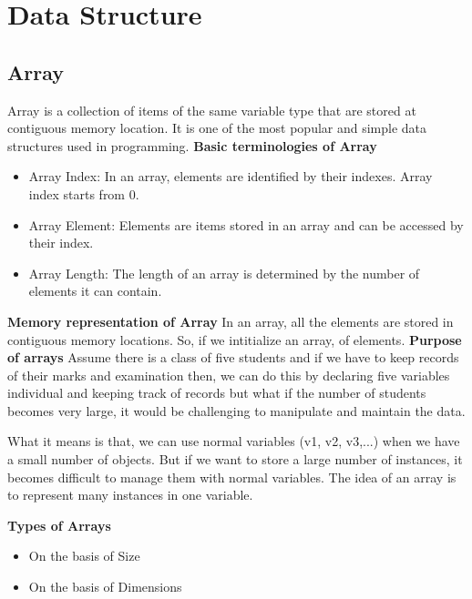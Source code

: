 \section{Data Structure}

\subsection{Array}
Array is a collection of items of the same variable type that are stored
at contiguous memory location. It is one of the most popular and simple
data structures used in programming.
\textbf{Basic terminologies of Array}
\begin{itemize}
\item Array Index: In an array, elements are identified by their
indexes. Array index starts from 0.
\item Array Element: Elements are items stored in an array and can be
accessed by their index.
\item Array Length: The length of an array is determined by the number
of elements it can contain.
\end{itemize}
\textbf{Memory representation of Array}
In an array, all the elements are stored in contiguous memory locations.
So, if we intitialize an array, of elements.
\textbf{Purpose of arrays}
Assume there is a class of five students and if we have to keep records
of their marks and examination then, we can do this by declaring five
variables individual and keeping track of records but what if the number
of students becomes very large, it would be challenging to manipulate
and maintain the data.

What it means is that, we can use normal variables (v1, v2, v3,...)
when we have a small number of objects. But if we want to store a large
number of instances, it becomes difficult to manage them with normal
variables. The idea of an array is to represent many instances in one
variable.

\textbf{Types of Arrays}
\begin{itemize}
    \item On the basis of Size
    \item On the basis of Dimensions
\end{itemize}


